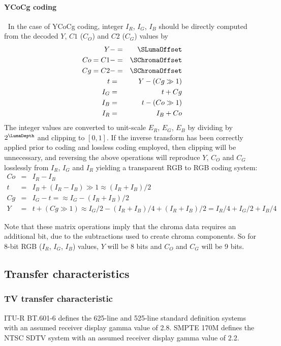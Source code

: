 \begin{informative*}
\paragraph{YCoCg coding}
$\ $\newline
In the case of YCoCg coding, integer $I_R$, $I_G$, $I_B$ should be directly computed from
the decoded $Y$, $C1$ ($C_O$) and $C2$ ($C_G$) values by
\begin{eqnarray*}
Y & -= & \SLumaOffset \\
Co=C1 & -= & \SChromaOffset \\
Cg=C2 & -= & \SChromaOffset \\
t & = & Y-(Cg\gg1) \\
I_G & = & t+Cg \\
I_B & = & t-(Co\gg1) \\
I_R & = & I_B+Co
\end{eqnarray*}
The integer values are converted to unit-scale $E_R$, $E_G$, $E_B$ by dividing by 
$2^\LumaDepth$ and clipping to $[0,1]$.
If the inverse transform has been correctly
applied prior to coding and lossless coding employed, then clipping will
be unnecessary, and reversing the above operations will reproduce $Y$, 
$C_O$ and $C_G$ losslessly from $I_R$, $I_G$ and $I_R$ yielding a transparent
 RGB to RGB coding system:
\begin{eqnarray*}
Co & = & I_R-I_B \\
t & = & I_B+(I_R-I_B)\gg1 \approx (I_R+I_B)/2\\
Cg & = & I_G-t = \approx I_G-(I_R+I_B)/2\\
Y & = & t+(Cg\gg1) \approx I_G/2-(I_R+I_B)/4+(I_R+I_B)/2=I_R/4+I_G/2+I_B/4
\end{eqnarray*}

Note that these matrix operations imply that the chroma data requires an
 additional bit, due to the subtractions used to create chroma components. 
So for 8-bit RGB ($I_R$, $I_G$, $I_B$) values, $Y$ will be 8 bits and $C_O$ and
$C_G$ will be 9 bits. 


\subsection{Transfer characteristics}
\subsubsection{TV transfer characteristic}

ITU-R BT.601-6 defines the 625-line and 525-line standard definition systems 
with an assumed receiver display gamma value of 2.8. SMPTE 170M defines the NTSC
 SDTV system with an assumed receiver display gamma value of 2.2.


\end{informative*}
